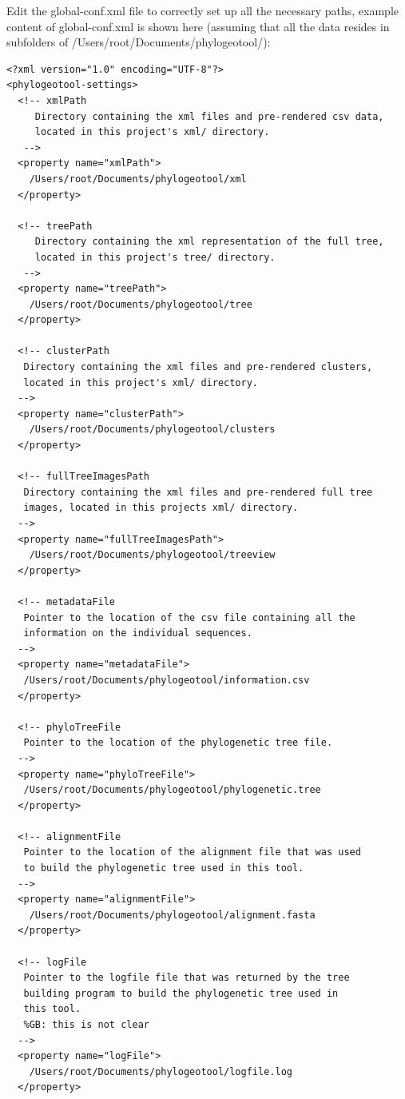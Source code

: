 \documentclass[a4paper, 11pt]{article} %
\begin{document}
Edit the global-conf.xml file to correctly set up all the necessary paths, example content of global-conf.xml is shown here (assuming that all the data resides in subfolders of /Users/root/Documents/phylogeotool/):
\begin{verbatim}
<?xml version="1.0" encoding="UTF-8"?>
<phylogeotool-settings>
  <!-- xmlPath
     Directory containing the xml files and pre-rendered csv data,
     located in this project's xml/ directory.
   -->
  <property name="xmlPath">
    /Users/root/Documents/phylogeotool/xml
  </property>

  <!-- treePath
     Directory containing the xml representation of the full tree,
     located in this project's tree/ directory.
   -->
  <property name="treePath">
    /Users/root/Documents/phylogeotool/tree
  </property>
  
  <!-- clusterPath
   Directory containing the xml files and pre-rendered clusters, 
   located in this project's xml/ directory.
  -->
  <property name="clusterPath">
    /Users/root/Documents/phylogeotool/clusters
  </property>
  
  <!-- fullTreeImagesPath
   Directory containing the xml files and pre-rendered full tree 
   images, located in this projects xml/ directory.
  -->   
  <property name="fullTreeImagesPath">
    /Users/root/Documents/phylogeotool/treeview
  </property>

  <!-- metadataFile
   Pointer to the location of the csv file containing all the 
   information on the individual sequences.
  -->
  <property name="metadataFile">
   /Users/root/Documents/phylogeotool/information.csv
  </property>

  <!-- phyloTreeFile
   Pointer to the location of the phylogenetic tree file.
  -->
  <property name="phyloTreeFile">
   /Users/root/Documents/phylogeotool/phylogenetic.tree
  </property>

  <!-- alignmentFile
   Pointer to the location of the alignment file that was used 
   to build the phylogenetic tree used in this tool.
  -->
  <property name="alignmentFile">
    /Users/root/Documents/phylogeotool/alignment.fasta
  </property>
  
  <!-- logFile
   Pointer to the logfile file that was returned by the tree 
   building program to build the phylogenetic tree used in 
   this tool.
   %GB: this is not clear
  -->
  <property name="logFile">
    /Users/root/Documents/phylogeotool/logfile.log
  </property>


\end{verbatim}
\end{document}

